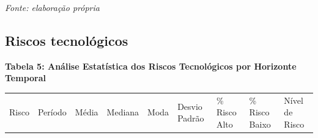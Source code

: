 \documentclass[
  portuguese,
  letterpaper,
  DIV=11,
  numbers=noendperiod]{scrreprt}
\begin{document}
\emph{Fonte: elaboração própria}

\subsection{Riscos tecnológicos}\label{riscos-tecnoluxf3gicos}

\textbf{Tabela 5: Análise Estatística dos Riscos Tecnológicos por
Horizonte Temporal}

\begin{longtable}[]{@{}
  >{\raggedright\arraybackslash}p{}
  >{\raggedright\arraybackslash}p{}
  >{\raggedright\arraybackslash}p{}
  >{\raggedright\arraybackslash}p{}
  >{\raggedright\arraybackslash}p{}
  >{\raggedright\arraybackslash}p{}
  >{\raggedright\arraybackslash}p{}
  >{\raggedright\arraybackslash}p{}
  >{\raggedright\arraybackslash}p{}@{}}
\toprule\noalign{}
\begin{minipage}[b]{\linewidth}\raggedright
Risco
\end{minipage} & \begin{minipage}[b]{\linewidth}\raggedright
Período
\end{minipage} & \begin{minipage}[b]{\linewidth}\raggedright
Média
\end{minipage} & \begin{minipage}[b]{\linewidth}\raggedright
Mediana
\end{minipage} & \begin{minipage}[b]{\linewidth}\raggedright
Moda
\end{minipage} & \begin{minipage}[b]{\linewidth}\raggedright
Desvio Padrão
\end{minipage} & \begin{minipage}[b]{\linewidth}\raggedright
\% Risco Alto
\end{minipage} & \begin{minipage}[b]{\linewidth}\raggedright
\% Risco Baixo
\end{minipage} & \begin{minipage}[b]{\linewidth}\raggedright
Nível de Risco
\end{minipage} \\

\end{longtable}
\end{document}
